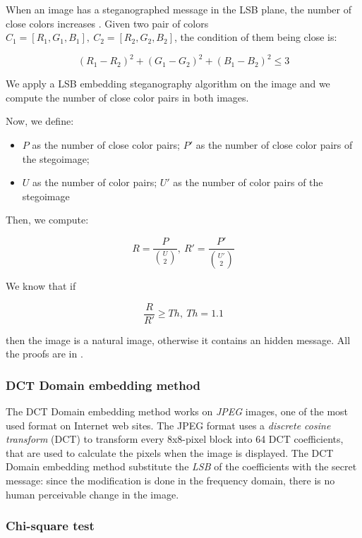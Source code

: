 \documentclass[../../main.tex]{subfiles}
\begin{document}
    When an image has a steganographed message in the LSB plane, the number of
    close colors increases \cite{detecting-lsb-steganography}. Given two pair of
    colors $C_1=[R_1,G_1,B_1],\ C_2=[R_2,G_2,B_2]$, the condition of them being
    close is:

    \[ (R_1-R_2)^2+(G_1-G_2)^2+(B_1-B_2)^2 \leq 3 \]

    We apply a LSB embedding steganography algorithm on the image and we compute
    the number of close color pairs in both images.

    Now, we define:

    \begin{itemize}
        \item $P$ as the number of close color pairs; $P'$ as the number of
              close color pairs of the stegoimage;
        \item $U$ as the number of color pairs; $U'$ as the number of color
              pairs of the stegoimage
    \end{itemize}

    Then, we compute:

    \[ R = \frac{P}{\binom{U}{2}},\ R' = \frac{P'}{\binom{U'}{2}} \]

    We know that if

    \[ \frac{R}{R'} \geq Th,\ Th = 1.1 \]

    \noindent then the image is a natural image, otherwise it contains an hidden
    message. All the proofs are in \cite{detecting-lsb-steganography}.

    \subsubsection{DCT Domain embedding method}
    The DCT Domain embedding method works on \emph{JPEG} images, one of the most
    used format on Internet web sites.
    The JPEG format uses a \emph{discrete cosine transform} (DCT) to transform
    every 8x8-pixel block into 64 DCT coefficients, that are used to calculate
    the pixels when the image is displayed.
    The DCT Domain embedding method substitute the \emph{LSB} of the
    coefficients with the secret message: since the modification is done in the
    frequency domain, there is no human perceivable change in the image.

    \subsubsection{Chi-square test}
\end{document}
